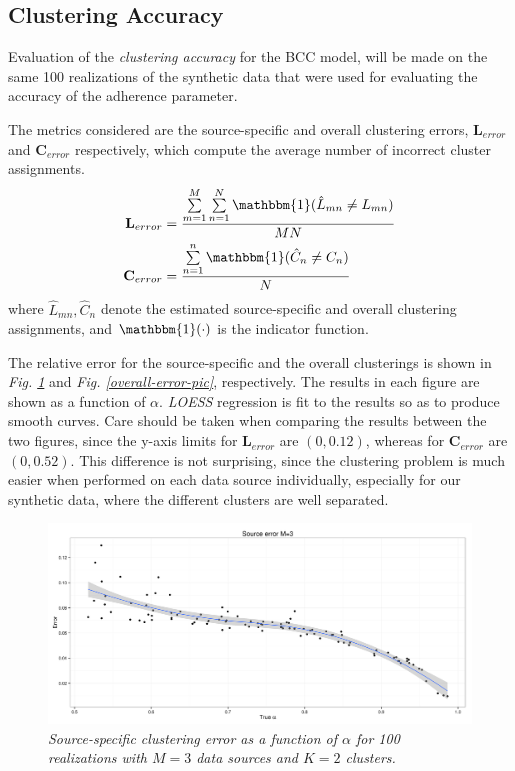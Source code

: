\subsection{Clustering Accuracy} \label{integr-synth-cluster-sect}
Evaluation of the \emph{clustering accuracy} for the BCC model, will be made on the same 100 realizations of the synthetic data that were used for evaluating the accuracy of the adherence parameter.

The metrics considered are the source-specific and overall clustering errors, $\mathbf{L}_{error}$ and $\mathbf{C}_{error}$ respectively, which compute the average number of incorrect cluster assignments. 
\begin{equation}
  \begin{aligned}
  	\mathbf{L}_{error} & = \frac{\sum\limits_{m=1}^{M}\sum\limits_{n=1}^{N}\mathbbm{1}(\hat{L}_{mn} \neq L_{mn})}{MN} \\
  	\mathbf{C}_{error} & = \frac{\sum\limits_{n=1}^{n}\mathbbm{1}(\hat{C}_{n} \neq C_{n})}{N}
  \end{aligned}
\end{equation}
where $\hat{L}_{mn}, \hat{C}_{n}$ denote the estimated source-specific and overall clustering assignments, and $\mathbbm{1}(\cdot)$ is the indicator function.

The relative error for the source-specific and the overall clusterings is shown in \emph{Fig. \ref{source-error-pic}} and \emph{Fig. \ref{overall-error-pic}}, respectively. The results in each figure are shown as a function of $\alpha$. \emph{LOESS} regression \citep{Cleveland1979} is fit to the results so as to produce smooth curves. Care should be taken when comparing the results between the two figures, since the y-axis limits for $\mathbf{L}_{error}$ are $(0,0.12)$, whereas for $\mathbf{C}_{error}$ are $(0,0.52)$. This difference is not surprising, since the clustering problem is much easier when performed on each data source individually, especially for our synthetic data, where the different clusters are well separated. 
\begin{figure}[!ht]
\begin{center}
 \includegraphics[scale = 0.39]{images/sourceError.png}
\caption{\emph{Source-specific clustering error as a function of $\alpha$ for 100 realizations with $M=3$ data sources and $K=2$ clusters.}}
\label{source-error-pic}
\end{center}
\end{figure}


